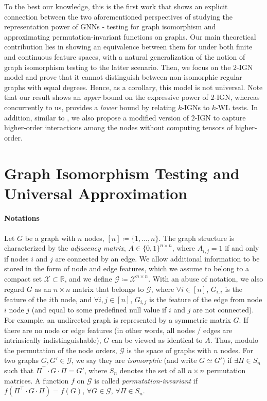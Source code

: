 \documentclass{article}
\def\Gfun{\mathcal{G}}
\begin{document}
To the best our knowledge, this is the first work that shows an explicit connection between the two aforementioned perspectives of studying the representation power of GNNs - testing for graph isomorphism and approximating permutation-invariant functions on graphs. Our main theoretical contribution lies in showing an equivalence between them for under both finite and continuous feature spaces, with a natural generalization of the notion of graph isomorphism testing to the latter scenario. Then, we focus on the $2$-IGN model and prove that it cannot distinguish between non-isomorphic regular graphs with equal degrees. Hence, as a corollary, this model is not universal. Note that our result shows an \emph{upper} bound on the expressive power of $2$-IGN, whereas concurrently to us, \cite{maron2019provably} provides a \emph{lower} bound by relating $k$-IGNs to $k$-WL tests. In addition, similar to \cite{maron2019provably}, we also propose a modified version of $2$-IGN to capture higher-order interactions among the nodes without computing tensors of higher-order.



\section{Graph Isomorphism Testing and Universal Approximation}
\label{sec:giso_ua}
\paragraph{Notations} Let $G$ be a graph with $n$ nodes, $[n] \coloneqq \{1, ..., n \}$. The graph structure is characterized by the \emph{adjacency matrix}, $A \in \{0, 1\}^{n \times n}$, where $A_{i, j} = 1$ if and only if nodes $i$ and $j$ are connected by an edge. We allow additional information to be stored in the form of node and edge features, which we assume to belong to a compact set $\mathcal{X}\subset \mathbb R$, and we define $\Gfun \coloneqq \mathcal{X}^{n \times n}$. With an abuse of notation, we also regard $G$ as an $n \times n$ matrix that belongs to $\Gfun$, where $\forall i \in [n]$, $G_{i, i}$ is the feature of the $i$th node, and $\forall i, j \in [n]$, $G_{i, j}$ is the feature of the edge from node $i$ node $j$ (and equal to some predefined null value if $i$ and $j$ are not connected). For example, an undirected graph is represented by a symmetric matrix $G$. If there are no node or edge features (in other words, all nodes / edges are intrinsically indistinguishable), $G$ can be viewed as identical to $A$. Thus, modulo the permutation of the node orders, $\Gfun$ is the space of graphs with $n$ nodes. For two graphs $G, G' \in \Gfun$, we say they are \emph{isomorphic} (and write $G \simeq G'$) if $\exists \Pi \in S_n$ such that $\Pi^\intercal \cdot  G \cdot \Pi = G'$, where $S_n$ denotes the set of all $n \times n$ permutation matrices. A function $f$ on $\Gfun$ is called \textit{permutation-invariant} if $f(\Pi^\intercal \cdot G \cdot \Pi) = f(G)$, $\forall G \in \Gfun$, $\forall \Pi \in S_n$. 
\end{document}
